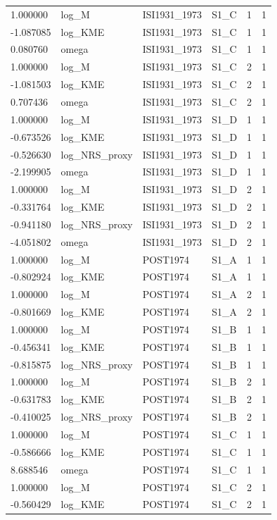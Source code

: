 \begin{tabular}{llllll}
1.000000 & log\_M & ISI1931\_1973 & S1\_C & 1 & 1 \\
-1.087085 & log\_KME & ISI1931\_1973 & S1\_C & 1 & 1 \\
0.080760 & omega & ISI1931\_1973 & S1\_C & 1 & 1 \\
1.000000 & log\_M & ISI1931\_1973 & S1\_C & 2 & 1 \\
-1.081503 & log\_KME & ISI1931\_1973 & S1\_C & 2 & 1 \\
0.707436 & omega & ISI1931\_1973 & S1\_C & 2 & 1 \\
1.000000 & log\_M & ISI1931\_1973 & S1\_D & 1 & 1 \\
-0.673526 & log\_KME & ISI1931\_1973 & S1\_D & 1 & 1 \\
-0.526630 & log\_NRS\_proxy & ISI1931\_1973 & S1\_D & 1 & 1 \\
-2.199905 & omega & ISI1931\_1973 & S1\_D & 1 & 1 \\
1.000000 & log\_M & ISI1931\_1973 & S1\_D & 2 & 1 \\
-0.331764 & log\_KME & ISI1931\_1973 & S1\_D & 2 & 1 \\
-0.941180 & log\_NRS\_proxy & ISI1931\_1973 & S1\_D & 2 & 1 \\
-4.051802 & omega & ISI1931\_1973 & S1\_D & 2 & 1 \\
1.000000 & log\_M & POST1974 & S1\_A & 1 & 1 \\
-0.802924 & log\_KME & POST1974 & S1\_A & 1 & 1 \\
1.000000 & log\_M & POST1974 & S1\_A & 2 & 1 \\
-0.801669 & log\_KME & POST1974 & S1\_A & 2 & 1 \\
1.000000 & log\_M & POST1974 & S1\_B & 1 & 1 \\
-0.456341 & log\_KME & POST1974 & S1\_B & 1 & 1 \\
-0.815875 & log\_NRS\_proxy & POST1974 & S1\_B & 1 & 1 \\
1.000000 & log\_M & POST1974 & S1\_B & 2 & 1 \\
-0.631783 & log\_KME & POST1974 & S1\_B & 2 & 1 \\
-0.410025 & log\_NRS\_proxy & POST1974 & S1\_B & 2 & 1 \\
1.000000 & log\_M & POST1974 & S1\_C & 1 & 1 \\
-0.586666 & log\_KME & POST1974 & S1\_C & 1 & 1 \\
8.688546 & omega & POST1974 & S1\_C & 1 & 1 \\
1.000000 & log\_M & POST1974 & S1\_C & 2 & 1 \\
-0.560429 & log\_KME & POST1974 & S1\_C & 2 & 1 \\

\end{tabular}
